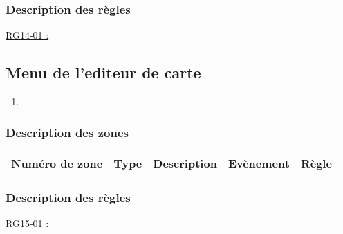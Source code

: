 \documentclass{report}
\begin{document}
		\subsubsection{Description des règles}

			\underline{RG14-01 :}
				\begin{quote}

				\end{quote}
				
				
				
\newpage

	\subsection{Menu de l'editeur de carte}
		
		\hypertarget{Menu_pause_creation_carte}{}
		\label{Menu_pause_creation_carte}
			
		\begin{center}
			
		\end{center}
		
		\begin{enumerate}
		  \item 
		\end{enumerate}

		\subsubsection{Description des zones}
		
			\begin{tabular}{|c|c|c|c|c|} \hline
				Numéro de zone & Type  & Description & Evènement &	Règle \\\hline
			\end{tabular}
			
		\subsubsection{Description des règles}

			\underline{RG15-01 :}
				\begin{quote}

				\end{quote}
				
\end{document}
